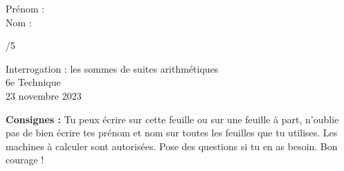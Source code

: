 


	\begin{minipage}[t]{.5\textwidth}
		{\large Prénom :\\
		Nom :}
	\end{minipage}%
	\begin{minipage}[t]{.5\textwidth}
		\begin{flushright}
			{\Large /5}
		\end{flushright}
	\end{minipage}

	\vspace{3em}
	\begin{center}
			{\Large Interrogation : les sommes de suites arithmétiques}\\
			{\large 6e Technique}\\
			23 novembre 2023
	\end{center}
	
	\vspace{3em}
	
	\textbf{Consignes :} Tu peux écrire sur cette feuille ou sur une feuille à part, n'oublie pas de bien écrire tes prénom et nom sur toutes les feuilles que tu utilises. Les machines à calculer sont autorisées. Pose des questions si tu en as besoin. Bon courage !
	
	\vspace{2em}
	
